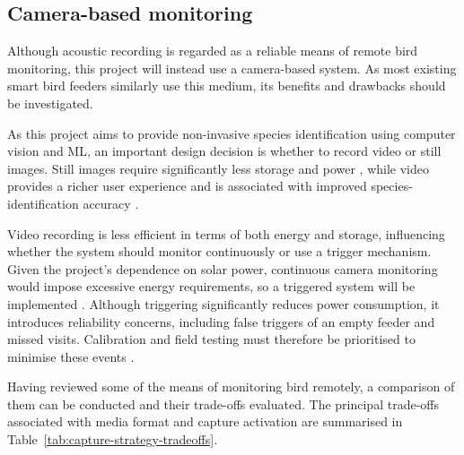 \subsection{Camera-based monitoring}


Although acoustic recording is regarded as a reliable means of remote bird monitoring, this project will instead use a camera-based system. As most existing smart bird feeders similarly use this medium, its benefits and drawbacks should be investigated.
\par\vspace{6pt}
As this project aims to provide non-invasive species identification using computer vision and ML, an important design decision is whether to record video or still images. Still images require significantly less storage and power \cite{GreenEtAl2023,JanischEtAl2021}, while video provides a richer user experience and is associated with improved species-identification accuracy \cite{GreenEtAl2023}.
\par\vspace{6pt}
Video recording is less efficient in terms of both energy and storage, influencing whether the system should monitor continuously or use a trigger mechanism. Given the project's dependence on solar power, continuous camera monitoring would impose excessive energy requirements, so a triggered system will be implemented \cite{JanischEtAl2021}. Although triggering significantly reduces power consumption, it introduces reliability concerns, including false triggers of an empty feeder and missed visits. Calibration and field testing must therefore be prioritised to minimise these events \cite{NeweyEtAl2015}. 
\par\vspace{6pt}
Having reviewed some of the means of monitoring bird remotely, a comparison of them can be conducted and their trade-offs evaluated. The principal trade-offs associated with media format and capture activation are summarised in Table~\ref{tab:capture-strategy-tradeoffs}.
\clearpage

